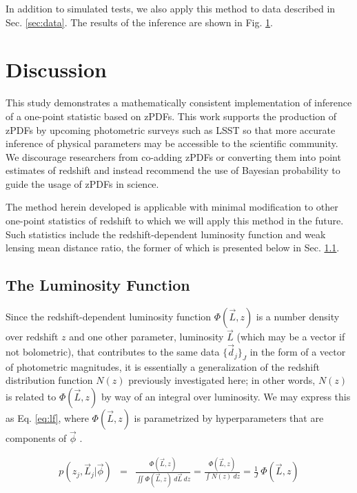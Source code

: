 \documentclass[preprint]{aastex}
\begin{document}
In addition to simulated tests, we also apply this method to data described in 
Sec. \ref{sec:data}.  The results of the inference are shown in Fig. 
\ref{fig:dataparam}.

\begin{figure}
\caption{}
\label{fig:dataparam}
\end{figure}

\clearpage
\section{Discussion}
\label{sec:disc}

This study demonstrates a mathematically consistent implementation of inference 
of a one-point statistic based on zPDFs.  This work supports the production of 
zPDFs by upcoming photometric surveys such as LSST so that more accurate 
inference of physical parameters may be accessible to the scientific community. 
 We discourage researchers from co-adding zPDFs or converting them into point 
estimates of redshift and instead recommend the use of Bayesian probability to 
guide the usage of zPDFs in science.

The method herein developed is applicable with minimal modification to other 
one-point statistics of redshift to which we will apply this method in the 
future.  Such statistics include the redshift-dependent luminosity function and 
weak lensing mean distance ratio, the former of which is presented below in 
Sec. \ref{sec:lf}.

\clearpage
\subsection{The Luminosity Function}
\label{sec:lf}

Since the redshift-dependent luminosity function $\Phi(\vec{L},z)$ is a number 
density over redshift $z$ and one other parameter, luminosity $\vec{L}$ (which 
may be a vector if not bolometric), that contributes to the same data 
$\{\vec{d}_{j}\}_{J}$ in the form of a vector of photometric magnitudes, it is 
essentially a generalization of the redshift distribution function $N(z)$ 
previously investigated here; in other words, $N(z)$ is related to 
$\Phi(\vec{L},z)$ by way of an integral over luminosity.   We may express this 
as Eq. \ref{eq:lf}, where $\Phi(\vec{L},z)$ is parametrized by hyperparameters 
that are components of $\vec{\phi}$ .

\begin{eqnarray}
\label{eq:lf}
p(z_{j},\vec{L}_{j}|\vec{\phi}) &=& \frac{\Phi(\vec{L},z)}{\iint 
\Phi(\vec{L},z)\ d\vec{L}\ dz} = \frac{\Phi(\vec{L},z)}{\int N(z)\ dz} = 
\frac{1}{J}\ \Phi(\vec{L},z)
\end{eqnarray}
\end{document}
